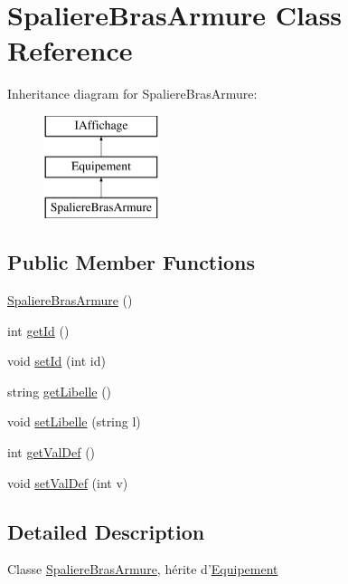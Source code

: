 \hypertarget{class_spaliere_bras_armure}{\section{\-Spaliere\-Bras\-Armure \-Class \-Reference}
\label{class_spaliere_bras_armure}
}
\-Inheritance diagram for \-Spaliere\-Bras\-Armure\-:\begin{figure}[H]
\begin{center}
\leavevmode
\includegraphics[height=3.000000cm]{class_spaliere_bras_armure}
\end{center}
\end{figure}
\subsection*{\-Public \-Member \-Functions}
\begin{DoxyCompactItemize}
\item 
\hyperlink{class_spaliere_bras_armure_abf26fad2754d5ece7b738597b86a77d6}{\-Spaliere\-Bras\-Armure} ()
\item 
int \hyperlink{class_spaliere_bras_armure_aced30cd7ce6d4b4cf0276ebd174164b5}{get\-Id} ()
\item 
void \hyperlink{class_spaliere_bras_armure_ab7de03f7a7056ec768400a3d6073f3ef}{set\-Id} (int id)
\item 
string \hyperlink{class_spaliere_bras_armure_a5cccfb1ec9c35ce6ff193b956922ac0b}{get\-Libelle} ()
\item 
void \hyperlink{class_spaliere_bras_armure_a8c7a3990c4cc8e4f01157b686d2b4f0a}{set\-Libelle} (string l)
\item 
int \hyperlink{class_spaliere_bras_armure_af0f4b0c780083719852fcff96bc0083f}{get\-Val\-Def} ()
\item 
void \hyperlink{class_spaliere_bras_armure_ac7c03928bacb86e6ff9a6743ed46cb16}{set\-Val\-Def} (int v)
\end{DoxyCompactItemize}


\subsection{\-Detailed \-Description}
\-Classe \hyperlink{class_spaliere_bras_armure}{\-Spaliere\-Bras\-Armure}, hérite d'\hyperlink{class_equipement}{\-Equipement} 

